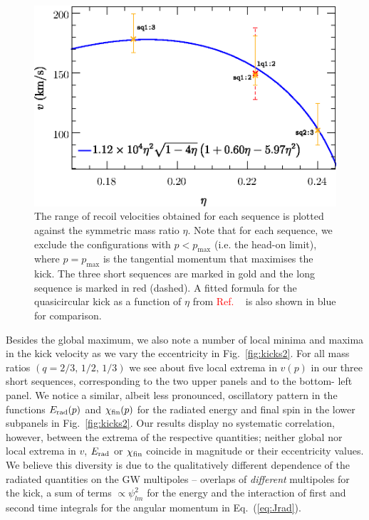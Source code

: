 \documentclass[floats,floatfix,showpacs,amssymb,prd,twocolumn,superscriptaddress,nofootinbib,nolongbibliography,reprint]{revtex4-2}
\newcommand{\mr}[1]{{\textcolor{cyan}{\sf{[MR: #1]}} }}
\newcommand{\us}[1]{{\textcolor{teal}{\sf{[US: #1]}} }}
\newcommand{\eb}[1]{{\textcolor{blue}{\sf{[EB: #1]}} }}
\newcommand{\new}[1]{{\textcolor{red}{ #1} }}
\begin{document}
\begin{figure}[t]
    \centering
    \includegraphics[width=\columnwidth]{quasicircular-fit2.eps}
    \caption{The range of recoil velocities obtained for each sequence
    is plotted against the symmetric mass ratio $\eta$. Note that for
    each sequence, we exclude the configurations with 
    $p<p_{\text{max}}$ (i.e. the head-on limit), where 
    $p=p_{\text{max}}$ is the tangential momentum that maximises the kick.
    The three short sequences are marked in gold and the long sequence is 
    marked in red (dashed). A fitted formula for the quasicircular
    kick as a function of $\eta$ from \new{ Ref.%
    ~\cite{Healy:2017mvh}} is
    also shown in blue for comparison. 
    }
    \label{fig:quasicircular-fit-comparison}
\end{figure}

Besides the global maximum, we also note a number of local minima and
maxima in the kick velocity as we vary the eccentricity in
Fig.~\ref{fig:kicks2}. For all mass ratios $(q=2/3,\,1/2,\,1/3)$ we
see about five 
local extrema in $v(p)$ in our three short sequences,
corresponding to the two upper panels and to the bottom-%
left panel.
We notice a similar, albeit less pronounced,
oscillatory pattern in the functions
$E_{\rm rad}(p)$ and $\chi_{\rm fin}(p)$ for the radiated
energy and final spin in the lower subpanels in
Fig.~\ref{fig:kicks2}. Our results display no systematic
correlation, however, between the extrema of the respective
quantities; neither global nor local extrema in $v$,
$E_{\rm rad}$ or $\chi_{\rm fin}$ coincide in
magnitude or their eccentricity values.
We believe this diversity is due to the qualitatively
different dependence of the radiated quantities on the
GW multipoles -- overlaps of {\it different} multipoles for the
kick, a sum of terms $\propto \psi_{lm}^2$ for the energy
and the interaction of first and second time integrals
for the angular momentum in Eq.~(\ref{eq:Jrad}).
\end{document}
